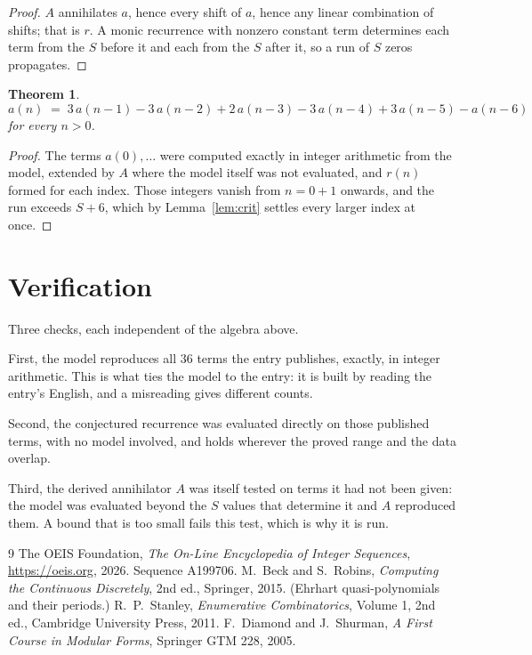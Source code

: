 \documentclass[11pt,a4paper]{article}
\theoremstyle{plain}
\newtheorem{theorem}{Theorem}
\theoremstyle{definition}
\begin{document}
\begin{proof}
$A$ annihilates $a$, hence every shift of $a$, hence any linear combination of shifts; that is
$r$. A monic recurrence with nonzero constant term determines each term from the $S$ before it
and each from the $S$ after it, so a run of $S$ zeros propagates.
\end{proof}

\begin{theorem}
\[
a(n)\;=\;3\,a(n-1) - 3\,a(n-2) + 2\,a(n-3) - 3\,a(n-4) + 3\,a(n-5) - a(n-6)
\]
for every $n>0$.
\end{theorem}

\begin{proof}
The terms $a(0),\dots$ were computed exactly in integer arithmetic from the model, extended by
$A$ where the model itself was not evaluated, and $r(n)$ formed for each index. Those integers
vanish from $n=0+1$ onwards, and the run exceeds $S+6$, which by
Lemma~\ref{lem:crit} settles every larger index at once.
\end{proof}

\section{Verification}

Three checks, each independent of the algebra above.

First, the model reproduces all $36$ terms the entry publishes, exactly, in integer
arithmetic. This is what ties the model to the entry: it is built by reading the entry's
English, and a misreading gives different counts.

Second, the conjectured recurrence was evaluated directly on those published terms, with no
model involved, and holds wherever the proved range and the data overlap.

Third, the derived annihilator $A$ was itself tested on terms it had not been given: the model
was evaluated beyond the $S$ values that determine it and $A$ reproduced them. A bound that is
too small fails this test, which is why it is run.

\begin{thebibliography}{9}
 The OEIS Foundation, \emph{The On-Line Encyclopedia of Integer
Sequences}, \url{https://oeis.org}, 2026. Sequence A199706.
 M.~Beck and S.~Robins, \emph{Computing the Continuous Discretely},
2nd ed., Springer, 2015. (Ehrhart quasi-polynomials and their periods.)
 R.~P.~Stanley, \emph{Enumerative Combinatorics}, Volume 1, 2nd ed.,
Cambridge University Press, 2011.
 F.~Diamond and J.~Shurman, \emph{A First Course in Modular Forms},
Springer GTM 228, 2005.
\end{thebibliography}
\end{document}
